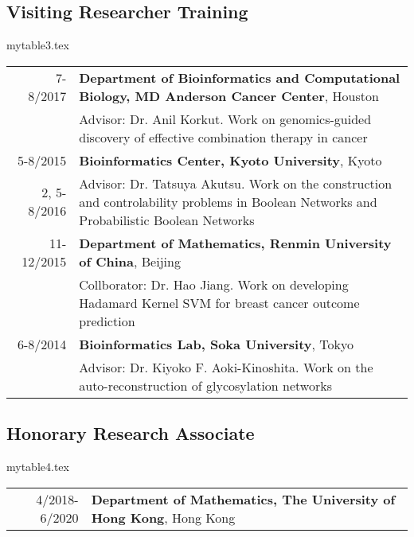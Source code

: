 \documentclass[10pt,letterpaper]{article}
\begin{document}
\subsection*{Visiting Researcher Training}
\begin{filecontents}{mytable3.tex}
\begin{longtable}{rX}
{\ \ \ } 7-8/2017  & {\bf Department of Bioinformatics and Computational Biology, MD Anderson Cancer Center}, Houston\\
&Advisor: Dr. Anil Korkut. Work on genomics-guided discovery of effective combination therapy in cancer \\
5-8/2015 & {\bf Bioinformatics Center, Kyoto University}, Kyoto \\
2, 5-8/2016 & Advisor: Dr. Tatsuya Akutsu. Work on the construction and controlability problems in Boolean Networks and Probabilistic Boolean Networks\\
11-12/2015 & \textbf{Department of Mathematics, Renmin University of China}, Beijing \\
& Collborator: Dr.  Hao Jiang. Work on developing Hadamard Kernel SVM for breast cancer outcome prediction\\
6-8/2014 & \textbf{Bioinformatics Lab, Soka University}, Tokyo \\
& Advisor: Dr. Kiyoko F. Aoki-Kinoshita. Work on the auto-reconstruction of glycosylation networks\\
\end{longtable}
\end{filecontents}

\subsection*{Honorary Research Associate}
\begin{filecontents}{mytable4.tex}
\begin{longtable}{rX}
4/2018-6/2020 & {\bf Department of Mathematics, The University of Hong Kong}, Hong Kong\\
\end{longtable}
\end{filecontents}
\end{document}
